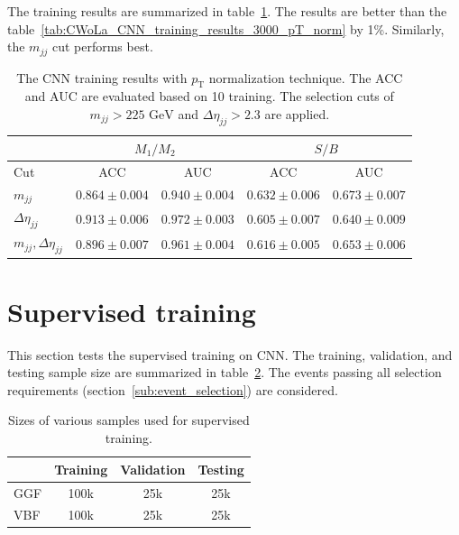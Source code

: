 \documentclass[12pt]{article}
\begin{document}
    The training results are summarized in table~\ref{tab:CWoLa_CNN_training_results_3000_pT_norm_225_2.3}. The results are better than the table~\ref{tab:CWoLa_CNN_training_results_3000_pT_norm} by 1\%. Similarly, the $m_{jj}$ cut performs best. 
    \begin{table}[htpb]
        \centering
        \caption{The CNN training results with $p_{\text{T}}$ normalization technique. The ACC and AUC are evaluated based on 10 training. The selection cuts of $m_{jj} > \text{225 GeV}$ and $\Delta\eta_{jj} > 2.3$ are applied.}
        \label{tab:CWoLa_CNN_training_results_3000_pT_norm_225_2.3}
        \begin{tabular}{l|cc|cc}
                                      & \multicolumn{2}{c|}{$M_1 / M_2$}      & \multicolumn{2}{c}{$S / B$}           \\ \hline
            Cut                       & ACC               & AUC               & ACC               & AUC               \\ \hline
            $m_{jj}$                  & $0.864 \pm 0.004$ & $0.940 \pm 0.004$ & $0.632 \pm 0.006$ & $0.673 \pm 0.007$ \\
            $\Delta\eta_{jj}$         & $0.913 \pm 0.006$ & $0.972 \pm 0.003$ & $0.605 \pm 0.007$ & $0.640 \pm 0.009$ \\
            $m_{jj}, \Delta\eta_{jj}$ & $0.896 \pm 0.007$ & $0.961 \pm 0.004$ & $0.616 \pm 0.005$ & $0.653 \pm 0.006$
        \end{tabular}
    \end{table}
\section{Supervised training}%
\label{sec:supervised_training}
    This section tests the supervised training on CNN. The training, validation, and testing sample size are summarized in table~\ref{tab:supervised_sample_size}. The events passing all selection requirements (section~\ref{sub:event_selection}) are considered.
    \begin{table}[htbp]
        \centering
        \caption{Sizes of various samples used for supervised training.}
        \label{tab:supervised_sample_size}
        \begin{tabular}{l|ccc}
                & Training & Validation & Testing \\ \hline
            GGF & 100k     & 25k        & 25k     \\
            VBF & 100k     & 25k        & 25k      
        \end{tabular}
    \end{table}
\end{document}
